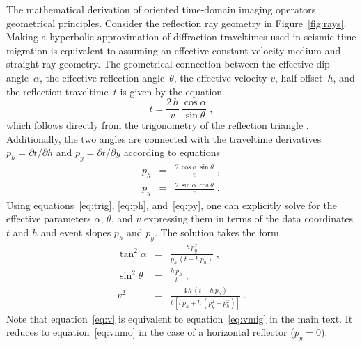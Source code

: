 The mathematical derivation of oriented time-domain imaging operators
  geometrical principles. Consider the
reflection ray geometry in Figure~\ref{fig:rays}. Making a hyperbolic
approximation of diffraction traveltimes used in seismic time
migration is equivalent to assuming an effective constant-velocity
medium and straight-ray geometry. The geometrical connection between
the effective dip angle~$\alpha$, the effective reflection
angle~$\theta$, the effective velocity $v$, half-offset~$h$, and the
reflection traveltime~$t$ is given by the equation
\begin{equation}
\label{eq:trig}
t = \frac{2\,h}{v}\,\frac{\cos{\alpha}}{\sin{\theta}}\;,
\end{equation}
which follows directly from the trigonometry of the reflection
triangle \cite[]{Clayton.sep.14.21,GEO68-05-16501661}. Additionally,
the two angles are connected with the traveltime derivatives $p_h =
\partial t/\partial h$ and $p_y = \partial t/\partial y$ according to
equations 
\begin{eqnarray}
\label{eq:ph}
p_h & = & \frac{2\,\cos{\alpha}\,\sin{\theta}}{v}\;, \\
\label{eq:py}
p_y & = & \frac{2\,\sin{\alpha}\,\cos{\theta}}{v}\;.
\end{eqnarray}
Using equations~\ref{eq:trig}, \ref{eq:ph}, and~\ref{eq:py}, one
can explicitly solve for the effective parameters $\alpha$, $\theta$,
and $v$ expressing them in terms of the data coordinates $t$ and $h$ and
event slopes $p_h$ and $p_y$. The solution takes the form
\begin{eqnarray}
\label{eq:alpha}
\tan^2{\alpha} & = & \frac{h\,p_y^2}{p_h\,(t-h\,p_h)}\;, \\
\label{eq:theta}
\sin^2{\theta} & = & \frac{h\,p_h}{t}\;, \\
\label{eq:v}
v^2 & = & \frac{4\,h\,(t-h\,p_h)}{t\,\left[t\,p_h + h\,(p_y^2-p_h^2)\right]}\;.
\end{eqnarray}
Note that equation~\ref{eq:v} is equivalent to
equation~\ref{eq:vmig} in the main text. It reduces to
equation~\ref{eq:vnmo} in the case of a horizontal reflector ($p_y=0$).

